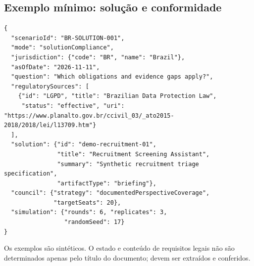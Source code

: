 \documentclass[10.5pt,a4paper,oneside]{article}
\begin{document}
\subsection{Exemplo mínimo: solução e conformidade}
\begin{lstlisting}
{
  "scenarioId": "BR-SOLUTION-001",
  "mode": "solutionCompliance",
  "jurisdiction": {"code": "BR", "name": "Brazil"},
  "asOfDate": "2026-11-11",
  "question": "Which obligations and evidence gaps apply?",
  "regulatorySources": [
    {"id": "LGPD", "title": "Brazilian Data Protection Law",
     "status": "effective", "uri": "https://www.planalto.gov.br/ccivil_03/_ato2015-2018/2018/lei/l13709.htm"}
  ],
  "solution": {"id": "demo-recruitment-01",
               "title": "Recruitment Screening Assistant",
               "summary": "Synthetic recruitment triage specification",
               "artifactType": "briefing"},
  "council": {"strategy": "documentedPerspectiveCoverage",
              "targetSeats": 20},
  "simulation": {"rounds": 6, "replicates": 3,
                 "randomSeed": 17}
}
\end{lstlisting}
Os exemplos s\~ao sint\'eticos. O estado e conte\'udo de requisitos legais n\~ao s\~ao determinados apenas pelo t\'itulo do documento; devem ser extra\'idos e conferidos.
\end{document}
